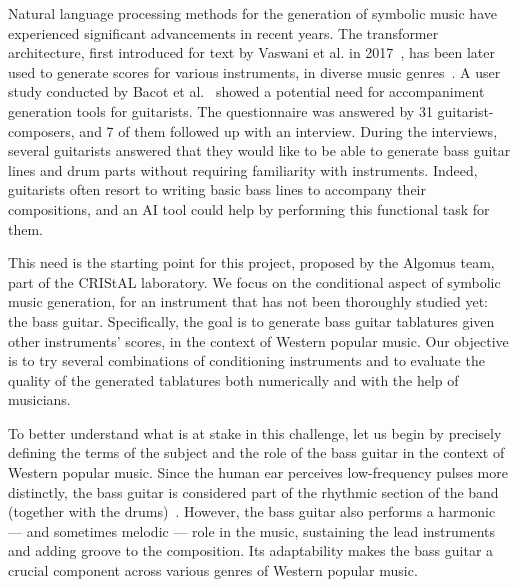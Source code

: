 Natural language processing methods for the generation of symbolic music have experienced significant advancements in recent years.
The transformer architecture, first introduced for text by Vaswani et al. in 2017~\cite{vaswani_attention_2017}, has been later used to generate scores for various instruments, in diverse music genres~\cite{le_natural_2024}.
A user study conducted by Bacot et al.~\cite{bacot_tablature_2025} showed a potential need for accompaniment generation tools for guitarists.
The questionnaire was answered by 31 guitarist-composers, and 7 of them followed up with an interview.
During the interviews, several guitarists answered that they would like to be able to generate bass guitar lines and drum parts without requiring familiarity with instruments.
Indeed, guitarists often resort to writing basic bass lines to accompany their compositions, and an AI tool could help by performing this functional task for them.

This need is the starting point for this project, proposed by the Algomus team, part of the CRIStAL laboratory.
We focus on the conditional aspect of symbolic music generation, for an instrument that has not been thoroughly studied yet: the bass guitar.
Specifically, the goal is to generate bass guitar tablatures given other instruments' scores, in the context of Western popular music.
Our objective is to try several combinations of conditioning instruments and to evaluate the quality of the generated tablatures both numerically and with the help of musicians.


To better understand what is at stake in this challenge, let us begin by precisely defining the terms of the subject and the role of the bass guitar in the context of Western popular music.
Since the human ear perceives low-frequency pulses more distinctly, the bass guitar is considered part of the rhythmic section of the band (together with the drums)~\cite{hove_superior_2014}.
However, the bass guitar also performs a harmonic — and sometimes melodic — role in the music, sustaining the lead instruments and adding groove to the composition.
Its adaptability makes the bass guitar a crucial component across various genres of Western popular music.


